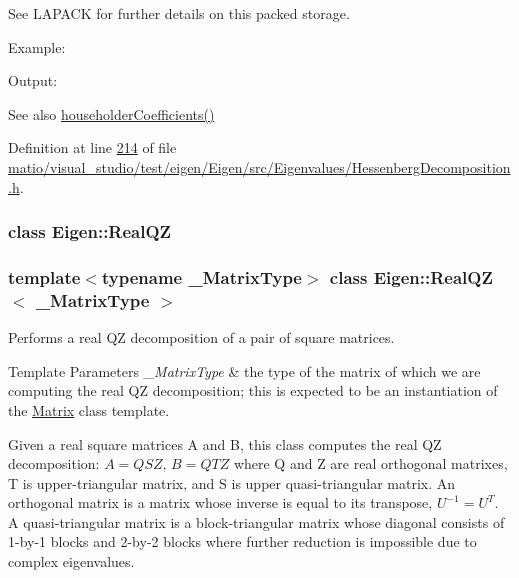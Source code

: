 See L\+A\+P\+A\+CK for further details on this packed storage.

Example\+: 
\begin{DoxyCodeInclude}
\end{DoxyCodeInclude}
 Output\+: 
\begin{DoxyVerbInclude}
\end{DoxyVerbInclude}


\begin{DoxySeeAlso}{See also}
\hyperlink{group___eigenvalues___module_a65fa81ce79d956baa59a30a6d82f8a84}{householder\+Coefficients()} 
\end{DoxySeeAlso}


Definition at line \hyperlink{matio_2visual__studio_2test_2eigen_2_eigen_2src_2_eigenvalues_2_hessenberg_decomposition_8h_source_l00214}{214} of file \hyperlink{matio_2visual__studio_2test_2eigen_2_eigen_2src_2_eigenvalues_2_hessenberg_decomposition_8h_source}{matio/visual\+\_\+studio/test/eigen/\+Eigen/src/\+Eigenvalues/\+Hessenberg\+Decomposition.\+h}.

\label{class_eigen_1_1_real_q_z}
\subsubsection{class Eigen\+:\+:Real\+QZ}
\subsubsection*{template$<$typename \+\_\+\+Matrix\+Type$>$\newline
class Eigen\+::\+Real\+Q\+Z$<$ \+\_\+\+Matrix\+Type $>$}

Performs a real QZ decomposition of a pair of square matrices. 


\begin{DoxyTemplParams}{Template Parameters}
{\em \+\_\+\+Matrix\+Type} & the type of the matrix of which we are computing the real QZ decomposition; this is expected to be an instantiation of the \hyperlink{group___core___module_class_eigen_1_1_matrix}{Matrix} class template.\\
\hline
\end{DoxyTemplParams}
Given a real square matrices A and B, this class computes the real QZ decomposition\+: $ A = Q S Z $, $ B = Q T Z $ where Q and Z are real orthogonal matrixes, T is upper-\/triangular matrix, and S is upper quasi-\/triangular matrix. An orthogonal matrix is a matrix whose inverse is equal to its transpose, $ U^{-1} = U^T $. A quasi-\/triangular matrix is a block-\/triangular matrix whose diagonal consists of 1-\/by-\/1 blocks and 2-\/by-\/2 blocks where further reduction is impossible due to complex eigenvalues.

